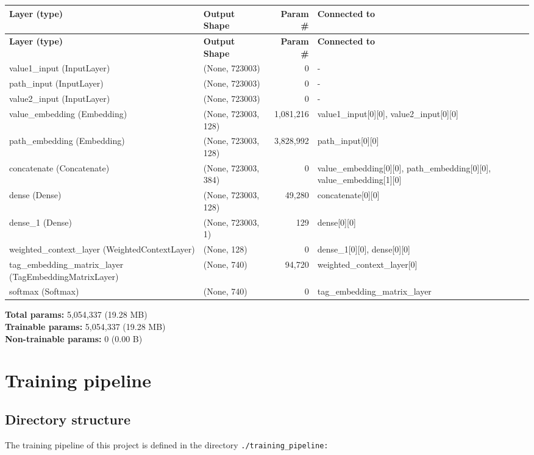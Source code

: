 \documentclass[10pt,english,a4paper]{report}
\begin{document}
\begin{longtable}{|p{4cm}|p{5cm}|r|p{4cm}|}
\hline
\textbf{Layer (type)} & \textbf{Output Shape} & \textbf{Param \#} & \textbf{Connected to} \\
\hline
\endfirsthead
\hline
\textbf{Layer (type)} & \textbf{Output Shape} & \textbf{Param \#} & \textbf{Connected to} \\
\hline
\endhead
value1\_input (InputLayer) & (None, 723003) & 0 & - \\
\hline
path\_input (InputLayer) & (None, 723003) & 0 & - \\
\hline
value2\_input (InputLayer) & (None, 723003) & 0 & - \\
\hline
value\_embedding (Embedding) & (None, 723003, 128) & 1,081,216 & value1\_input[0][0], value2\_input[0][0] \\
\hline
path\_embedding (Embedding) & (None, 723003, 128) & 3,828,992 & path\_input[0][0] \\
\hline
concatenate (Concatenate) & (None, 723003, 384) & 0 & value\_embedding[0][0], path\_embedding[0][0], value\_embedding[1][0] \\
\hline
dense (Dense) & (None, 723003, 128) & 49,280 & concatenate[0][0] \\
\hline
dense\_1 (Dense) & (None, 723003, 1) & 129 & dense[0][0] \\
\hline
weighted\_context\_layer (WeightedContextLayer) & (None, 128) & 0 & dense\_1[0][0], dense[0][0] \\
\hline
tag\_embedding\_matrix\_layer (TagEmbeddingMatrixLayer) & (None, 740) & 94,720 & weighted\_context\_layer[0] \\
\hline
softmax (Softmax) & (None, 740) & 0 & tag\_embedding\_matrix\_layer \\
\hline
\end{longtable}

\noindent \textbf{Total params:} 5,054,337 (19.28 MB) \\
\textbf{Trainable params:} 5,054,337 (19.28 MB) \\
\textbf{Non-trainable params:} 0 (0.00 B)


\section{Training pipeline}

\subsection{Directory structure}
The training pipeline of this project is defined in the directory \texttt{./training\_pipeline:}
\end{document}
